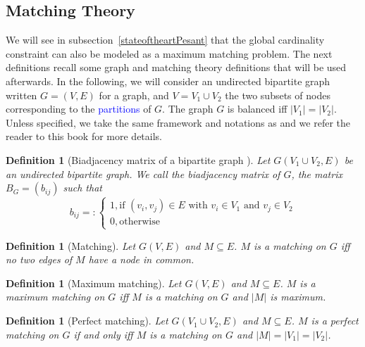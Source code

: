 \documentclass[jair,twoside,11pt,theapa]{article}
\newtheorem{definition}[theorem]{Definition}
\newcommand{\minor}[1]{\textcolor{blue}{#1}}
\begin{document}
\subsection{Matching Theory}
\label{matchingbackground}
We will see in subsection~\ref{stateoftheartPesant} that the global cardinality constraint can also be modeled as a maximum matching problem. The next definitions recall some graph and matching theory definitions that will be used afterwards. In the following, we will consider an undirected bipartite graph written $G=(V,E)$ for a graph, and $V = V_1 \cup V_2$ the two subsets of nodes corresponding to the \minor{partitions} of $G$. The graph $G$ is balanced iff $|V_1|=|V_2|$. Unless specified, we take the same framework and notations as \cite{MT09} and we refer the reader to this book for more details.

\begin{definition}[Biadjacency matrix of a bipartite graph %
]
	Let $G(V_1 \cup V_2, E)$ be an undirected bipartite graph. We call the biadjacency matrix of $G$, the matrix $B_G=(b_{ij})$ such that
	\begin{equation}
		b_{ij} = \colon\begin{cases}
							1, \text{if } (v_i,v_j) \in E \text{ with } v_i \in V_1 \text{ and } v_j \in V_2 \\
							0, \text{otherwise}
						\end{cases}
\end{equation}
\end{definition}

\begin{definition}[Matching%
]
Let $G(V,E)$ and $M \subseteq E$. $M$ is a matching on $G$ iff no two edges of $M$ have a node in common.
\end{definition}

\begin{definition}[Maximum matching%
]
Let $G(V,E)$ and $M \subseteq E$. $M$ is a maximum matching on $G$  iff $M$ is a matching on $G$ and $|M|$ is maximum.%
\end{definition}

\begin{definition}[Perfect matching%
]
Let $G(V_1\cup V_2,E)$ and $M \subseteq E$. $M$ is a perfect matching on $G$ if and only iff $M$ is a matching on $G$ and $|M|=|V_1|=|V_2|$.%
\end{definition}
\end{document}
